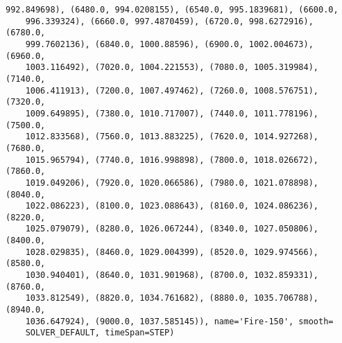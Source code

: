 \documentclass[12pt, letterpaper, oneside]{report}
\begin{document}
\begin{lstlisting}[frame=none]
    992.849698), (6480.0, 994.0208155), (6540.0, 995.1839681), (6600.0, 
    996.339324), (6660.0, 997.4870459), (6720.0, 998.6272916), (6780.0, 
    999.7602136), (6840.0, 1000.88596), (6900.0, 1002.004673), (6960.0, 
    1003.116492), (7020.0, 1004.221553), (7080.0, 1005.319984), (7140.0, 
    1006.411913), (7200.0, 1007.497462), (7260.0, 1008.576751), (7320.0, 
    1009.649895), (7380.0, 1010.717007), (7440.0, 1011.778196), (7500.0, 
    1012.833568), (7560.0, 1013.883225), (7620.0, 1014.927268), (7680.0, 
    1015.965794), (7740.0, 1016.998898), (7800.0, 1018.026672), (7860.0, 
    1019.049206), (7920.0, 1020.066586), (7980.0, 1021.078898), (8040.0, 
    1022.086223), (8100.0, 1023.088643), (8160.0, 1024.086236), (8220.0, 
    1025.079079), (8280.0, 1026.067244), (8340.0, 1027.050806), (8400.0, 
    1028.029835), (8460.0, 1029.004399), (8520.0, 1029.974566), (8580.0, 
    1030.940401), (8640.0, 1031.901968), (8700.0, 1032.859331), (8760.0, 
    1033.812549), (8820.0, 1034.761682), (8880.0, 1035.706788), (8940.0, 
    1036.647924), (9000.0, 1037.585145)), name='Fire-150', smooth=
    SOLVER_DEFAULT, timeSpan=STEP)
	

\end{lstlisting}
\end{document}
